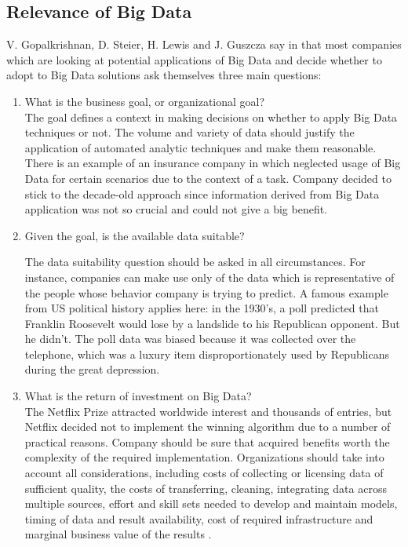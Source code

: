 \documentclass[runningheads]{llncs}
\begin{document}
\subsection{Relevance of Big Data}
V. Gopalkrishnan, D. Steier, H. Lewis and J. Guszcza say in \cite{Gopalkrishnan} that most companies which are looking at potential applications of Big Data and decide whether to adopt to Big Data solutions ask themselves three main questions:
\begin{enumerate}
\item What is the business goal, or organizational goal?\\

The goal defines a context in making decisions on whether to apply Big Data techniques or not. The volume and variety of data should justify the application of automated analytic techniques and make them reasonable. There is an example of an insurance company in \cite{Gopalkrishnan} which neglected usage of Big Data for certain scenarios due to the context of a task. Company decided to stick to the decade-old approach since information derived from Big Data application was not so crucial and could not give a big benefit.\\ 
\item Given the goal, is the available data suitable? 

The data suitability question should be asked in all circumstances. For instance, companies can make use only of the data which is representative of the people whose behavior company is trying to predict. A famous example from US political history applies here: in the 1930's, a poll predicted that Franklin Roosevelt would lose by a landslide to his Republican opponent. But he didn't. The poll data was biased because it was collected over the telephone, which was a luxury item disproportionately used by Republicans during the great depression.\\

\item What is the return of investment on Big Data?\\

The Netflix Prize attracted worldwide interest and thousands of entries, but Netflix decided not to implement the winning algorithm \cite{NETFLIX} due to a number of practical reasons. Company should be sure that acquired benefits worth the complexity of the required implementation. Organizations should take into account all considerations, including costs of collecting or licensing data of sufficient quality, the costs of transferring, cleaning, integrating data across multiple sources, effort and skill sets needed to develop and maintain models, timing of data and result availability, cost of required infrastructure and marginal business value of the results \cite{Gopalkrishnan}.
\end{enumerate}
\end{document}
